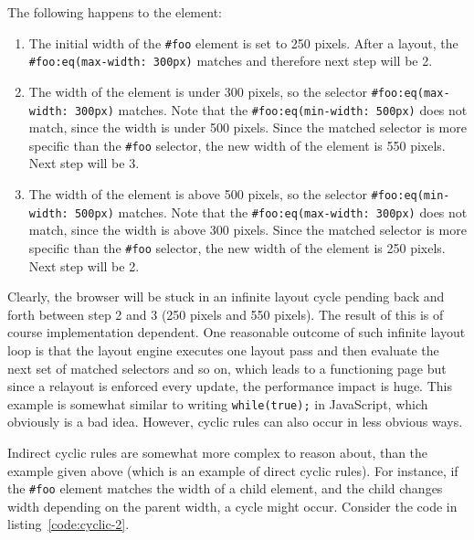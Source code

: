 \documentclass[a4paper,11pt]{kth-mag}
\newcommand{\code}[1]{\texttt{#1}}
\begin{document}
          The following happens to the \gls{element}:
          \begin{enumerate}
          \item The initial width of the \code{\#foo} \gls{element} is set to 250 pixels.
          After a layout, the \code{\#foo:eq(max-width: 300px)} matches and therefore next step will be 2.
          \item The width of the \gls{element} is under 300 pixels, so the selector \code{\#foo:eq(max-width: 300px)} matches.
          Note that the \code{\#foo:eq(min-width: 500px)} does not match, since the width is under 500 pixels.
          Since the matched selector is more specific than the \code{\#foo} selector, the new width of the \gls{element} is 550 pixels.
          Next step will be 3.
          \item The width of the \gls{element} is above 500 pixels, so the selector \code{\#foo:eq(min-width: 500px)} matches.
          Note that the \code{\#foo:eq(max-width: 300px)} does not match, since the width is above 300 pixels.
          Since the matched selector is more specific than the \code{\#foo} selector, the new width of the \gls{element} is 250 pixels.
          Next step will be 2.
          \end{enumerate}
          Clearly, the \gls{browser} will be stuck in an infinite layout cycle pending back and forth between step 2 and 3 (250 pixels and 550 pixels).
          The result of this is of course implementation dependent.
          One reasonable outcome of such infinite layout loop is that the \gls{layout engine} executes one layout pass and then evaluate the next set of matched selectors and so on, which leads to a functioning page but since a relayout is enforced every update, the performance impact is huge.
          This example is somewhat similar to writing \code{while(true);} in \gls{JavaScript}, which obviously is a bad idea.
          However, cyclic rules can also occur in less obvious ways. 

          Indirect cyclic rules are somewhat more complex to reason about, than the example given above (which is an example of direct cyclic rules).
          For instance, if the \code{\#foo} \gls{element} matches the width of a child \gls{element}, and the child changes width depending on the parent width, a cycle might occur.
          Consider the code in listing~\ref{code:cyclic-2}.
          
\end{document}
